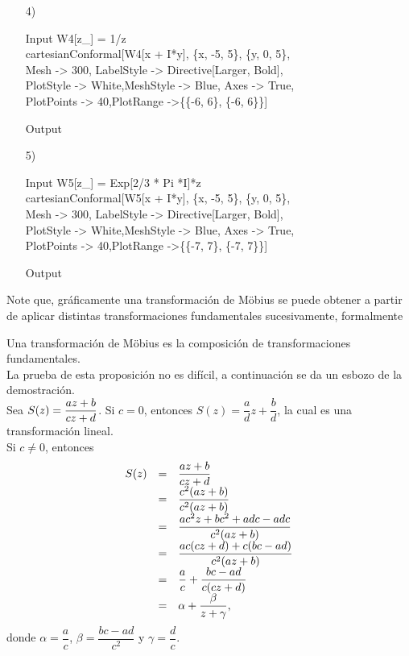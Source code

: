 \begin{Ejem}
\begin{itemize}
	\item [4)] \begin{mmaCell}{Input}
		W4[z_] = 1/z \\cartesianConformal[W4[x + I*y], \{x, -5, 5\}, \{y, 0, 5\},\\Mesh -> 300, LabelStyle -> Directive[Larger, Bold],\\PlotStyle -> White,MeshStyle -> Blue, Axes -> True,\\PlotPoints -> 40,PlotRange ->\{\{-6, 6\}, \{-6, 6\}\}]
	\end{mmaCell}
	\begin{mmaCell}[moregraphics={moreig={scale=0.7}}]{Output}
	\end{mmaCell}

	\item [5)] \begin{mmaCell}{Input}
		W5[z_] = Exp[2/3 * Pi *I]*z \\cartesianConformal[W5[x + I*y], \{x, -5, 5\}, \{y, 0, 5\},\\Mesh -> 300, LabelStyle -> Directive[Larger, Bold],\\PlotStyle -> White,MeshStyle -> Blue, Axes -> True,\\PlotPoints -> 40,PlotRange ->\{\{-7, 7\}, \{-7, 7\}\}]
	\end{mmaCell}
	\begin{mmaCell}[moregraphics={moreig={scale=0.7}}]{Output}
	\end{mmaCell}
\end{itemize}
	
\end{Ejem}
Note que, gráficamente  una transformación de M\"obius se puede obtener a partir de aplicar distintas transformaciones fundamentales sucesivamente, formalmente 
\begin{prop}\label{prop4}
	Una transformación de M\"obius es la composición de transformaciones fundamentales.\\
	La prueba de esta proposición no es difícil, a continuación se da un esbozo de la demostración.\\ Sea $S(z)=\dfrac{az+b}{cz+d}$. Si $c=0$, entonces $S(z)=\dfrac{a}{d}z+\dfrac{b}{d}$, la cual es una transformación lineal.\\
	Si $c\neq 0$, entonces 
	\[
		\begin{array}{ccl}
			S(z)&=&\dfrac{az+b}{cz+d}\\
			&=&\dfrac{c^2(az+b)}{c^2(az+b)}\\
			&=&\dfrac{ac^2z + bc^2 + adc - adc}{c^2(az+b)}\\
			&=&\dfrac{ac(cz+d)+c(bc-ad)}{c^2(az+b)}\\
			&=&\dfrac{a}{c}+\dfrac{bc-ad}{c(cz+d)}\\
			&=&\alpha +\dfrac{\beta}{z+\gamma},
		\end{array}
	\]
	donde $\alpha=\dfrac{a}{c}$, $\beta=\dfrac{bc-ad}{c^2}$ y $\gamma=\dfrac{d}{c}$.\endproof
\end{prop}

